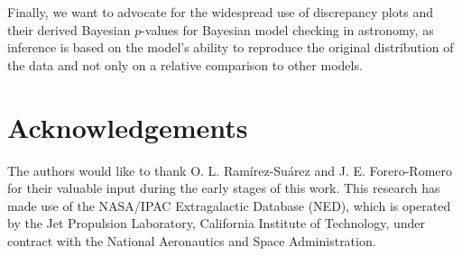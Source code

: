 \documentclass[a4paper,fleqn,usenatbib]{mnras}
\begin{document}
Finally, we want to advocate for the widespread use of discrepancy plots and their derived Bayesian $p$-values for  Bayesian model checking in astronomy, as inference is based on the model's ability to reproduce the original distribution of the data and not only on a relative comparison to other models.

\section*{Acknowledgements}

The authors would like to thank O. L. Ram\'irez-Su\'arez and J. E. Forero-Romero for their valuable input during the early stages of this work. This research has made use of the NASA/IPAC Extragalactic Database (NED), which is operated by the Jet Propulsion Laboratory, California Institute of Technology, under contract with the National Aeronautics and Space Administration.










\appendix
\end{document}
